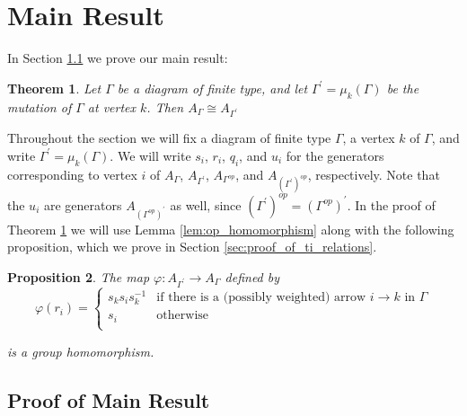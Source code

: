 \documentclass[11pt]{amsart}
\newtheorem{thm}{Theorem}[section]
\newtheorem{prop}[thm]{Proposition}
\theoremstyle{definition}
\begin{document}
\section{Main Result}\label{sec:main_result}
\noindent In Section \ref{sec:proof_of_main_result} we prove our main result:

\begin{thm}\label{thm:main}
Let $\Gamma$ be a diagram of finite type, and let $\Gamma^{\prime} = \mu_k(\Gamma)$ be the mutation of $\Gamma$ at vertex $k$. Then $A_{\Gamma} \cong A_{\Gamma^{\prime}}$
\end{thm}


Throughout the section we will fix a diagram of finite type $\Gamma$, a vertex $k$ of $\Gamma$, and write $\Gamma^{\prime} = \mu_k(\Gamma)$.  We will write $s_i$, $r_i$, $q_i$, and $u_i$ for the generators corresponding to vertex $i$ of $A_{\Gamma}$, $A_{\Gamma^\prime}$, $A_{\Gamma^{op}}$, and $A_{\left(\Gamma^\prime\right)^{op}}$, respectively. Note that the $u_i$ are generators $A_{\left(\Gamma^{op}\right)^\prime}$ as well, since $\left(\Gamma^\prime\right)^{op} = \left(\Gamma^{op}\right)^\prime$.  In the proof of Theorem \ref{thm:main} we will use Lemma \ref{lem:op_homomorphism} along with the following proposition, which we prove in Section \ref{sec:proof_of_ti_relations}.


\begin{prop}\label{prop:ti_relations}
The map $\varphi \colon A_{\Gamma^\prime}\rightarrow A_{\Gamma}$ defined by
\begin{displaymath}
\varphi(r_i) = \begin{cases} s_ks_is_k^{-1} & \mbox{if there is a (possibly weighted) arrow } i \rightarrow k \mbox{ in } \Gamma\\
s_i & \mbox{otherwise}\\
\end{cases}
\end{displaymath}

\noindent is a group homomorphism.
\end{prop}



\subsection{Proof of Main Result}\label{sec:proof_of_main_result}


\end{document}

